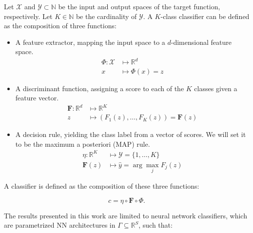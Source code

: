 \begin{definition}[Classifier]\label{def:classifier}
    Let $\mathcal{X}$ and $\mathcal{Y} \subset\mathbb{N}$ be the input and output spaces of the target function, respectively.
    Let $K \in \mathbb{N}$ be the cardinality of $\mathcal{Y}$.
    A $K$-class classifier can be defined as the 
    composition of three functions:

    \begin{itemize}
        \item A feature extractor, mapping the input space to a $d$-dimensional feature space.
            $$ 
            \begin{aligned}
                \Phi: \mathcal{X} & \longmapsto \mathbb{R}^d \\
                x & \longmapsto \Phi(x) = z
            \end{aligned}
            $$

        \item A discriminant function, assigning a score
        to each of the $K$ classes given a feature vector. 
            $$
            \begin{aligned}
                \bm{F}: \mathbb{R}^d  & \longmapsto \mathbb{R}^K \\
                z & \longmapsto \left ( F_1(z), \dots, F_K(z) \right ) = \bm{F}(z)
            \end{aligned}
            $$
        \item A decision rule, yielding the class label from a vector of scores.
        We will set it to be the maximum a posteriori (MAP) rule.
            $$
                \begin{aligned}
                    \eta: \mathbb{R}^K & \longmapsto \mathcal{Y} = \{1, \dots, K \} \\
                    \bm{F}(z) & \longmapsto \hat{y} = \arg \max_{j} F_j(z)
                \end{aligned}
            $$
    \end{itemize}

    A classifier is defined as the composition of these three functions:

    $$
    c = \eta \circ \bm{F} \circ \Phi.
    $$
\end{definition}

The results presented in this work are limited to neural network classifiers, which are
parametrized NN architectures in $\Gamma \subseteq \mathbb{R}^{S}$, such that:

